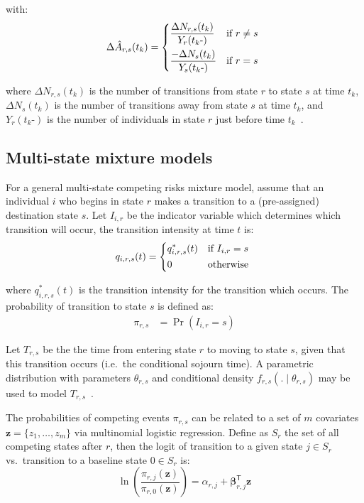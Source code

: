 with:
%
\[
    \Delta\hat{A}_{r,s}(t_k) =
    \begin{dcases*}
        \frac{\Delta N_{r,s}(t_k)}{Y_{r}(t_k \mbox{-})} & if $r\neq s$ \\
        \frac{-\Delta N_{s}(t_k)}{Y_{s}(t_k \mbox{-})}  & if $r = s$
    \end{dcases*}
\]

where $\Delta N_{r,s}(t_k)$ is the number of transitions from state $r$ to state $s$ at time $t_k$, $\Delta N_{s}(t_k)$ is the number of transitions away from state $s$ at time $t_k$, and $Y_{r}(t_k \mbox{-})$ is the number of individuals in state $r$ just before time $t_k$~\parencite{Borgan2014-dv}.

\subsection{Multi-state mixture models}

For a general multi-state competing risks mixture model, assume that an individual $i$ who begins in state $r$ makes a transition to a (pre-assigned) destination state $s$. Let $I_{i,r}$ be the indicator variable which determines which transition will occur, the transition intensity at time $t$ is:
%
\[
    q_{i,r,s}(t) =
    \begin{dcases*}
        q^{*}_{i,r,s}(t) & if $I_{i,r} = s$ \\
        0                & otherwise
    \end{dcases*}
\]

where $q^{*}_{i,r,s}(t)$ is the transition intensity for the transition which occurs. The probability of transition to state $s$ is defined as:
%
\begin{align*}
    \pi_{r,s} & = \Pr(I_{i,r} = s)
\end{align*}

Let $T_{r,s}$ be the the time from entering state $r$ to moving to state $s$, given that this transition occurs (i.e.\ the conditional sojourn time). A parametric distribution with parameters $\theta_{r,s}$ and conditional density $f_{r,s}(. \mid \theta_{r,s})$ may be used to model $T_{r,s}$~\parencite{Ghani2005-or}.

The probabilities of competing events $\pi_{r,s}$ can be related to a set of $m$ covariates $\bm{z} = \{z_1, \ldots, z_m\}$ via multinomial logistic regression. Define as $S_r$ the set of all competing states after $r$, then the logit of transition to a given state $j \in S_r$ vs.\ transition to a baseline state $0 \in S_r$ is:
%
\[
    \ln\left(\frac{\pi_{r,j}(\bm{z})}{\pi_{r,0}(\bm{z})}\right) = \alpha_{r,j} + \bm{\beta}_{r,j}^\mathsf{T} \bm{z}
\]

